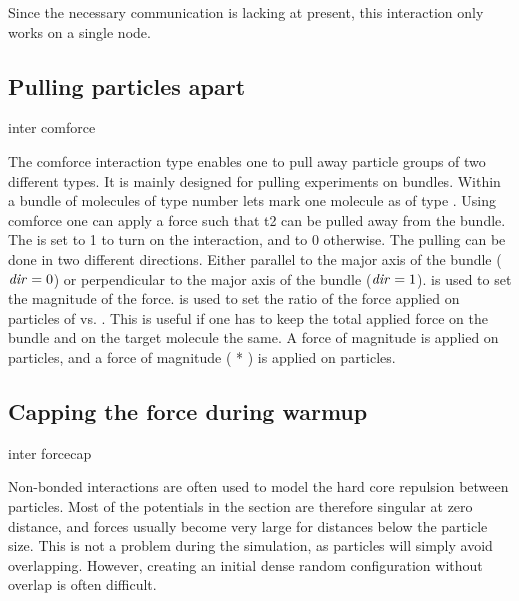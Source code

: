 Since the necessary communication is lacking at present, this interaction
only works on a single node.

\subsection{Pulling particles apart}
\begin{essyntax}
  inter  
  comforce    
  \begin{features}
  \end{features}
\end{essyntax}
The comforce interaction type enables one to pull away particle groups
of two different types. It is mainly designed for pulling experiments
on bundles. Within a bundle of molecules of type number 
lets mark one molecule as of type . Using comforce one
can apply a force such that t2 can be pulled away from the bundle. The
 is set to 1 to turn on the interaction, and to 0
otherwise. The pulling can be done in two different directions. Either
parallel to the major axis of the bundle ($\var{dir} = 0$) or
perpendicular to the major axis of the bundle ($\var{dir} = 1$).
 is used to set the magnitude of the force.  
is used to set the ratio of the force applied on particles of
 vs. . This is useful if one has to keep the
total applied force on the bundle and on the target molecule the same.
A force of magnitude  is applied on 
particles, and a force of magnitude ( * ) is
applied on  particles.

\subsection{Capping the force during warmup}
\label{sec:forcecap}

\begin{essyntax}
  inter forcecap 
\end{essyntax}

Non-bonded interactions are often used to model the hard core
repulsion between particles. Most of the potentials in the section are
therefore singular at zero distance, and forces usually become very
large for distances below the particle size. This is not a problem
during the simulation, as particles will simply avoid overlapping.
However, creating an initial dense random configuration without
overlap is often difficult.

